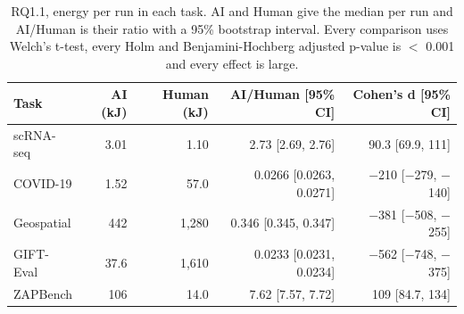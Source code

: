 \begin{table}[ht]
\centering
\caption{RQ1.1, energy per run in each task. AI and Human give the median per run and AI/Human is their ratio with a 95\% bootstrap interval. Every comparison uses Welch's t-test, every Holm and Benjamini-Hochberg adjusted p-value is $<$ 0.001 and every effect is large.} 
\label{tab:04_rq1_1_energy_tests}
\begingroup\small
\begin{tabular}{lrrrr}
  \toprule
Task & AI (kJ) & Human (kJ) & AI/Human [95\% CI] & Cohen's d [95\% CI] \\ 
  \midrule
scRNA-seq & 3.01 & 1.10 & 2.73 [2.69, 2.76] & 90.3 [69.9, 111] \\ 
  COVID-19 & 1.52 & 57.0 & 0.0266 [0.0263, 0.0271] & $-$210 [$-$279, $-$140] \\ 
  Geospatial & 442 & 1,280 & 0.346 [0.345, 0.347] & $-$381 [$-$508, $-$255] \\ 
  GIFT-Eval & 37.6 & 1,610 & 0.0233 [0.0231, 0.0234] & $-$562 [$-$748, $-$375] \\ 
  ZAPBench & 106 & 14.0 & 7.62 [7.57, 7.72] & 109 [84.7, 134] \\ 
   \bottomrule
\end{tabular}
\endgroup
\end{table}
